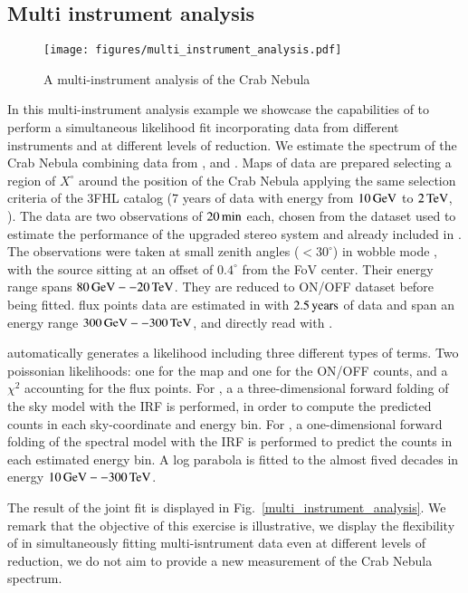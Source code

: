 \subsection{Multi instrument analysis}
\label{ssec:multi-instrument-analysis}

\begin{figure*}[t]
	\sidecaption
	\texttt{[image: figures/multi\_instrument\_analysis.pdf]}
	\caption{A multi-instrument analysis of the Crab Nebula}
	\label{fig:multi_instrument_analysismulti_instrument_analysis}
\end{figure*}


In this multi-instrument analysis example we showcase the capabilities of \gammapy
to perform a simultaneous likelihood fit incorporating data from different instruments
and at different levels of reduction.
We estimate the spectrum of the Crab Nebula combining data from \fermi, \magic and \hawc.
Maps of \fermi data are prepared selecting a region of $X^{\circ}$ around the
position of the Crab Nebula applying the same selection criteria of the 3FHL
catalog (7 years of data with energy from $10\,{\rm GeV}$ to $2\,{\rm TeV}$, \citealt{3FHL}).
The \magic data are two observations of $20\,{\rm min}$ each, chosen from the
dataset used to estimate the performance of the upgraded stereo system \citep{magic_performance}
and already included in \cite{joint_crab}. The observations were taken at small
zenith angles ($<30^{\circ}$) in wobble mode \citep{fomin_1994}, with the source
sitting at an offset of $0.4^{\circ}$ from the FoV center. Their energy range spans
$80\,{\rm GeV} -- 20\,{\rm TeV}$. They are reduced to ON/OFF dataset before being fitted.
\hawc flux points data are estimated in \cite{hawc_crab_2019} with $2.5\,{\rm years}$
of data and span an energy range $300\,{\rm GeV} -- 300\,{\rm TeV}$, and directly read with \gammapy.

\gammapy automatically generates a likelihood including three different types of
terms. Two poissonian likelihoods: one for the \fermi map and one for the ON/OFF
counts, and a $\chi^2$ accounting for the flux points. For \fermi, a
a three-dimensional forward folding of the sky model with the IRF is performed,
in order to compute the predicted counts in each sky-coordinate and energy bin.
For \magic, a one-dimensional forward folding of the spectral model with the IRF
is performed to predict the counts in each estimated energy bin.
A log parabola is fitted to the almost fived decades in energy $10\,{\rm GeV} -- 300\,{\rm TeV}$.

The result of the joint fit is displayed in Fig.~\ref{multi_instrument_analysis}.
We remark that the objective of this exercise is illustrative, we display the
flexibility of \gammapy in simultaneously fitting multi-isntrument data even at
different levels of reduction, we do not aim to provide a new measurement of the
Crab Nebula spectrum.

